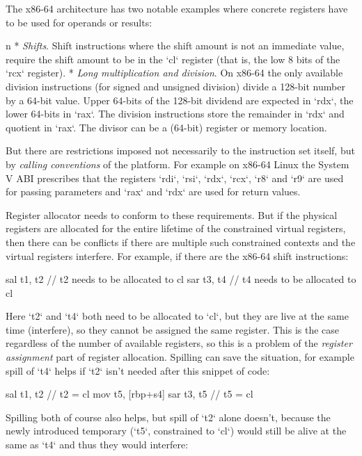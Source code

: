 The x86-64 architecture has two notable examples where concrete registers have
to be used for operands or results:

\begitems\style n
* {\em Shifts}. Shift instructions where the shift amount is not an immediate
value, require the shift amount to be in the `cl` register (that is, the low 8
bits of the `rcx` register).
* {\em Long multiplication and division}. On x86-64 the only available
division instructions (for signed and unsigned division) divide a 128-bit number
by a 64-bit value.%
%
Upper 64-bits of the 128-bit dividend are expected in `rdx`,
the lower 64-bits in `rax`. The division instructions store the remainder in
`rdx` and quotient in `rax`. The divisor can be a (64-bit) register or memory
location.
\enditems

But there are restrictions imposed not necessarily to the instruction set
itself, but by {\em calling conventions} of the platform. For example on x86-64
Linux the System V ABI prescribes that the registers `rdi`, `rsi`, `rdx`, `rcx`,
`r8` and `r9` are used for passing parameters and `rax` and `rdx` are used for
return values.

Register allocator needs to conform to these requirements. But if the physical
registers are allocated for the entire lifetime of the constrained virtual
registers, then there can be conflicts if there are multiple such constrained
contexts and the virtual registers interfere. For example, if there are the
x86-64 shift instructions:

\begtt
sal t1, t2 // t2 needs to be allocated to cl
sar t3, t4 // t4 needs to be allocated to cl
\endtt

Here `t2` and `t4` both need to be allocated to `cl`, but they are live at the
same time (interfere), so they cannot be assigned the same register. This is the
case regardless of the number of available registers, so this is a problem of
the {\em register assignment} part of register allocation. Spilling can save the
situation, for example spill of `t4` helps if `t2` isn't needed after this
snippet of code:

\begtt
sal t1, t2 // t2 = cl
mov t5, [rbp+s4]
sar t3, t5 // t5 = cl
\endtt

Spilling both of course also helps, but spill of `t2` alone doesn't, because the
newly introduced temporary (`t5`, constrained to `cl`) would still be alive at the
same as `t4` and thus they would interfere:

